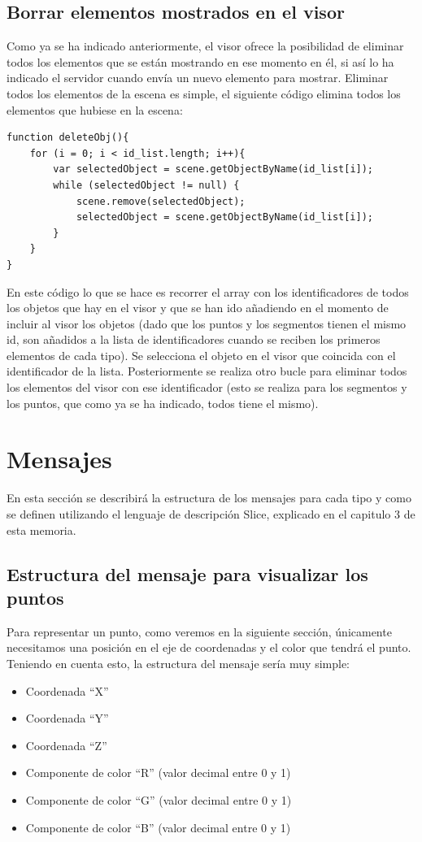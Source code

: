 \subsection{Borrar elementos mostrados en el visor}
Como ya se ha indicado anteriormente, el visor ofrece la posibilidad de eliminar todos los elementos que se están mostrando en ese momento en él, si así lo ha indicado el servidor cuando envía un nuevo elemento para mostrar. Eliminar todos los elementos de la escena es simple, el siguiente código elimina todos los elementos que hubiese en la escena:

\begin{lstlisting}[frame=single]
function deleteObj(){
	for (i = 0; i < id_list.length; i++){
		var selectedObject = scene.getObjectByName(id_list[i]);
		while (selectedObject != null) {
			scene.remove(selectedObject);
			selectedObject = scene.getObjectByName(id_list[i]);
		}
	}
}
\end{lstlisting}
En este código lo que se hace es recorrer el array con los identificadores de todos los objetos que hay en el visor y que se han ido añadiendo en el momento de incluir al visor los objetos (dado que los puntos y los segmentos tienen el mismo id, son añadidos a la lista de identificadores cuando se reciben los primeros elementos de cada tipo). Se selecciona el objeto en el visor que coincida con el identificador de la lista. Posteriormente se realiza otro bucle para eliminar todos los elementos del visor con ese identificador (esto se realiza para los segmentos y los puntos, que como ya se ha indicado, todos tiene el mismo).

\section{Mensajes}
En esta sección se describirá la estructura de los mensajes para cada tipo y como se definen utilizando el lenguaje de descripción Slice, explicado en el capitulo 3 de esta memoria. 
\subsection{Estructura del mensaje para visualizar los puntos}
Para representar un punto, como veremos en la siguiente sección, únicamente necesitamos una posición en el eje de coordenadas y el color que tendrá el punto. Teniendo en cuenta esto, la estructura del mensaje sería muy simple:
\begin{itemize}
\item Coordenada ``X''
\item Coordenada ``Y''
\item Coordenada ``Z''
\item Componente de color ``R'' (valor decimal entre 0 y 1)
\item Componente de color ``G'' (valor decimal entre 0 y 1)
\item Componente de color ``B'' (valor decimal entre 0 y 1)
\end{itemize}

